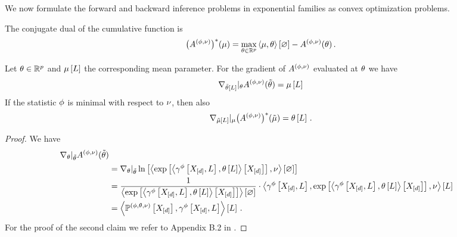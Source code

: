 
We now formulate the forward and backward inference problems in exponential families as convex optimization problems.

The conjugate dual of the cumulative function is
\begin{align*}
    \big(A^{(\phi,\nu)}\big)^*(\mu) = \max_{\theta\in\mathbb{R}^{p}} \left\langle \mu,\theta\right\rangle \left[ \varnothing \right] - A^{(\phi,\nu)}(\theta) \, .
\end{align*}

\begin{lemma}\label{lem:gradientCumfunction}
    Let $\theta\in\mathbb{R}^{p}$ and $\mu\left[L\right]$ the corresponding mean parameter.
    For the gradient of $A^{(\phi,\nu)}$ evaluated at $\theta$ we have
    \begin{align*}
        \nabla_{\tilde{\theta}\left[L\right]}|_{\theta} A^{(\phi,\nu)}(\tilde{\theta}) = \mu\left[L\right]
    \end{align*}
    If the statistic $\phi$ is minimal with respect to $\nu$, then also
    \begin{align*}
        \nabla_{\tilde{\mu}\left[L\right]}|_{\mu} \big(A^{(\phi,\nu)}\big)^*(\tilde{\mu})
        = \theta\left[L\right] \, .
    \end{align*}
\end{lemma}
\begin{proof}
    We have
    \begin{align*}
        \nabla_{\theta}|_{\tilde{\theta}} A^{(\phi,\nu)}(\tilde{\theta}) \\
        & = \nabla_{\theta}|_{\tilde{\theta}} \ln \left[ \left\langle \mathrm{exp}\left[\left\langle \gamma^{\phi}\left[X_{[d]},L\right],\theta\left[L\right]\right\rangle \left[ X_{[d]} \right]\right],\nu\right\rangle \left[ \varnothing \right] \right] \\
        & = \frac{1}{\left\langle \mathrm{exp}\left[\left\langle \gamma^{\phi}\left[X_{[d]},L\right],\theta\left[L\right]\right\rangle \left[ X_{[d]} \right]\right]\right\rangle \left[ \varnothing \right]}  \cdot \left\langle \gamma^{\phi}\left[X_{[d]},L\right],\mathrm{exp}\left[\left\langle \gamma^{\phi}\left[X_{[d]},L\right],\theta\left[L\right]\right\rangle \left[ X_{[d]} \right]\right],\nu\right\rangle \left[ L \right]\\
        & = \left\langle \mathbb{P}^{(\phi,\theta,\nu)}\left[X_{[d]}\right],\gamma^{\phi}\left[X_{[d]},L\right]\right\rangle \left[ L \right] \, .
    \end{align*}
    For the proof of the second claim we refer to Appendix B.2 in \cite{wainwright_graphical_2008}.
\end{proof}

